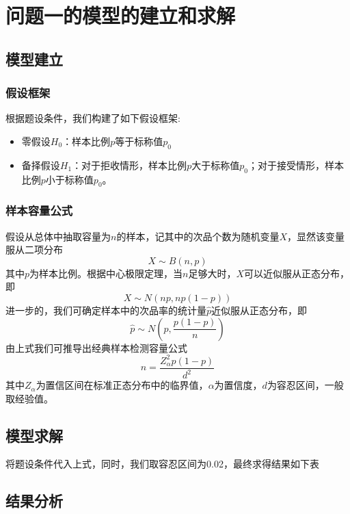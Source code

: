 \documentclass[withoutpreface,bwprint]{cumcmthesis}
\begin{document}

\section{问题一的模型的建立和求解}
\subsection{模型建立}
\subsubsection{假设框架}
根据题设条件，我们构建了如下假设框架:
\begin{itemize}
   \item 零假设$H_0$：样本比例$p$等于标称值$p_0$
   \item 备择假设$H_1$：对于拒收情形，样本比例$p$大于标称值$p_0$；对于接受情形，样本比例$p$小于标称值$p_0$。
\end{itemize}
\subsubsection{样本容量公式}
假设从总体中抽取容量为$n$的样本，记其中的次品个数为随机变量$X$，显然该变量服从二项分布
\begin{equation}
X\sim B(n,p)
\end{equation}
其中$p$为样本比例。根据中心极限定理，当$n$足够大时，$X$可以近似服从正态分布，即\begin{equation}
X\sim N(np,np(1-p))
\end{equation}
进一步的，我们可确定样本中的次品率的统计量$\hat{p}$近似服从正态分布，即
\begin{equation}
\hat{p}\sim N(p,\frac{p(1-p)}{n})
\end{equation}
由上式我们可推导出经典样本检测容量公式
\begin{equation}
n=\frac{Z^2_{\alpha}p(1-p)}{d^2}
\end{equation}
其中$Z_{\alpha}$为置信区间在标准正态分布中的临界值，$\alpha$为置信度，$d$为容忍区间，一般取经验值。

\subsection{模型求解}
将题设条件代入上式，同时，我们取容忍区间为0.02，最终求得结果如下表
\subsection{结果分析}
\end{document}
